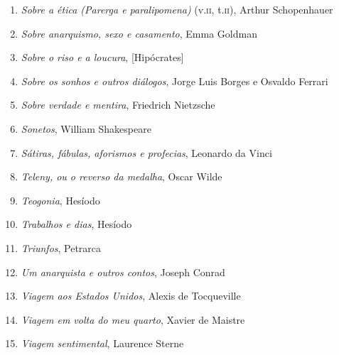 \begin{enumerate}
\item \textit{Sobre a ética (Parerga e paralipomena)} (v.\textsc{ii}, t.\textsc{ii}), Arthur Schopenhauer 
\item \textit{Sobre anarquismo, sexo e casamento}, Emma Goldman
\item \textit{Sobre o riso e a loucura}, [Hipócrates]
\item \textit{Sobre os sonhos e outros diálogos}, Jorge Luis Borges e Osvaldo Ferrari
\item \textit{Sobre verdade e mentira}, Friedrich Nietzsche
\item \textit{Sonetos}, William Shakespeare
\item \textit{Sátiras, fábulas, aforismos e profecias}, Leonardo da Vinci
\item \textit{Teleny, ou o reverso da medalha}, Oscar Wilde
\item \textit{Teogonia}, Hesíodo
\item \textit{Trabalhos e dias}, Hesíodo
\item \textit{Triunfos}, Petrarca
\item \textit{Um anarquista e outros contos}, Joseph Conrad
\item \textit{Viagem aos Estados Unidos}, Alexis de Tocqueville
\item \textit{Viagem em volta do meu quarto}, Xavier de Maistre 
\item \textit{Viagem sentimental}, Laurence Sterne
\end{enumerate}


